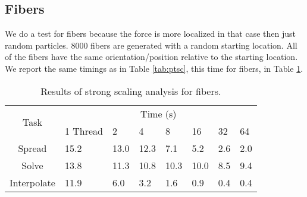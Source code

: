 \documentclass[]{article}
\begin{document}
\subsection{Fibers}
We do a test for fibers because the force is more localized in that case then just random particles. 8000 fibers are generated with a random starting location. All of the fibers have the same orientation/position relative to the starting location. We report the same timings as in Table \ref{tab:ptsc}, this time for fibers, in Table \ref{tab:fibsc}. 
\begin{table}
\centering
\begin{tabular}{|c||l|l|l|l|l|l|l|}
	\hline
	\multirow{2}{*}{Task} 
	& \multicolumn{7}{c|}{Time (s)}  \\
	& 1 Thread & 2 & 4 & 8 & 16 & 32 & 64\\  \hline
	Spread & 15.2 & 13.0 & 12.3  & 7.1 & 5.2 & 2.6 & 2.0\\      \hline
	Solve & 13.8 & 11.3  & 10.8  & 10.3 & 10.0 & 8.5 & 9.4\\      \hline
	Interpolate & 11.9 & 6.0 & 3.2 & 1.6 & 0.9 & 0.4 & 0.4\\  \hline
\end{tabular}
\caption{Results of strong scaling analysis for fibers.}
\label{tab:fibsc}
\end{table}
\end{document}
